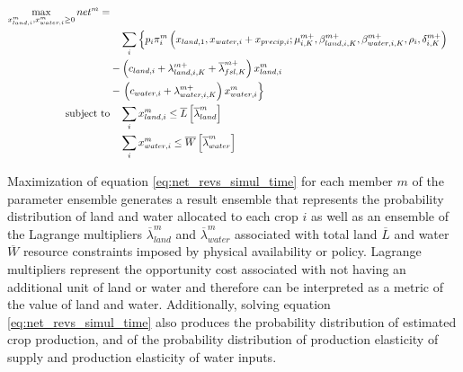 \begin{equation}\label{eq:net_revs_simul_time}
    \begin{split}
        \max_{x^m_{land, i} , x^m_{water, i} \geq 0 } net^m =\\
        &\quad \sum_{i} \left\{ p_i \pi^m_i\left( x_{land,1}, x_{water,i} + x_{precip,i}; \mu^{m+}_{i,K}, \beta^{m+}_{land,i,K},\beta^{m+}_{water,i,K}, \rho_{i}, \delta^{m+}_{i,K} \right) \right. \\
        &- \left(c_{land,i} + \lambda^{m+}_{land,i,K} + \overline{\lambda}^{m+}_{fsl,K} \right) x^m_{land,i} \\
        &- \left. \left( c_{water,i} + \lambda^{m+}_{water,i,K} \right) x^m_{water,i} \vphantom{\sum} \right\} \\
        \text{subject to} & \quad\sum_{i} x^m_{land,i} \leq \overline{L} \left[ \overline{ \lambda }^m_{ land } \right]\\
        & \quad\sum_{i} x^m_{water, i} \leq \overline{W} \left[ \overline{ \lambda }^m_{ water } \right]
    \end{split}
\end{equation}

Maximization of equation \eqref{eq:net_revs_simul_time} for each member $m$ of the parameter ensemble generates a result ensemble that represents the probability distribution of land and water allocated to each crop $i$ as well as an ensemble of the Lagrange multipliers $\overline{ \lambda }^m_{ land }$ and $\overline{ \lambda }^m_{ water }$ associated with  total land $\overline{L}$ and water $\overline{W}$ resource constraints imposed by physical availability or policy. Lagrange multipliers represent  the opportunity cost associated with not having an additional unit of land or water and therefore can be interpreted as a metric of the value of land and water. Additionally, solving equation \eqref{eq:net_revs_simul_time} also produces the probability distribution of estimated crop production, and of the probability distribution of production elasticity of supply and production elasticity of water inputs. 